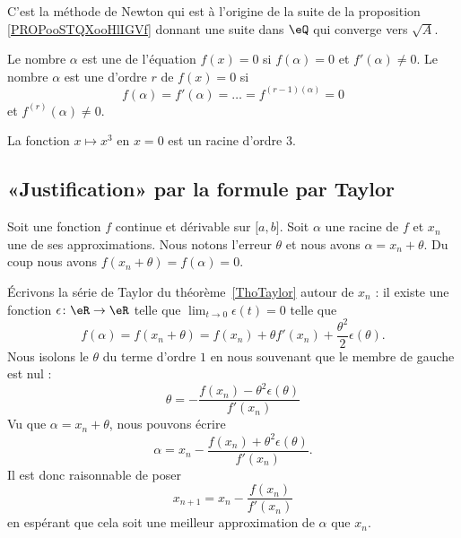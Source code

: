 C'est la méthode de Newton qui est à l'origine de la suite de la proposition \ref{PROPooSTQXooHlIGVf} donnant une suite dans \( \eQ\) qui converge vers \( \sqrt{ A} \).

\begin{definition}      \label{DEFooXSOQooAnWqKM}
    Le nombre \( \alpha\) est une  de l'équation \( f(x)=0\) si \( f(\alpha)=0\) et \( f'(\alpha)\neq 0\). Le nombre \( \alpha\) est une  d'ordre \( r\) de \( f(x)=0\) si
    \begin{equation}
        f(\alpha)=f'(\alpha)=\ldots=f^{(r-1)(\alpha)}=0
    \end{equation}
    et \( f^{(r)}(\alpha)\neq 0\).
\end{definition}

\begin{example}
    La fonction \( x\mapsto x^3\) en \( x=0\) est un racine d'ordre \( 3\).
\end{example}

\subsection{«Justification» par la formule par Taylor}

    Soit une fonction \( f\) continue et dérivable sur \( \mathopen[ a , b \mathclose]\). Soit \( \alpha\) une racine de \( f\) et \( x_n\) une de ses approximations.  Nous notons l'erreur \( \theta\) et nous avons \( \alpha=x_n+\theta\). Du coup nous avons \( f(x_n+\theta)=f(\alpha)=0\).

    Écrivons la série de Taylor du théorème~\ref{ThoTaylor} autour de \( x_n\) : il existe une fonction \( \epsilon\colon \eR\to \eR\) telle que \( \lim_{t\to 0} \epsilon(t)=0\) telle que
    \begin{equation}        \label{EQooOPUBooYaznay}
        f(\alpha)=f(x_n+\theta)=f(x_n)+\theta f'(x_n)+\frac{ \theta^2 }{ 2 }\epsilon(\theta).
    \end{equation}
    Nous isolons le \( \theta\) du terme d'ordre \( 1\) en nous souvenant que le membre de gauche est nul :
    \begin{equation}
        \theta=-\frac{ f(x_n)-\theta^2\epsilon(\theta) }{ f'(x_n) }
    \end{equation}
    Vu que \( \alpha=x_n+\theta\), nous pouvons écrire
    \begin{equation}
        \alpha=x_n-\frac{ f(x_n)+\theta^2\epsilon(\theta) }{ f'(x_n) }.
    \end{equation}
    Il est donc raisonnable de poser
    \begin{equation}
        x_{n+1}=x_n-\frac{ f(x_n) }{ f'(x_n) }
    \end{equation}
    en espérant que cela soit une meilleur approximation de \( \alpha\) que \( x_n\).

